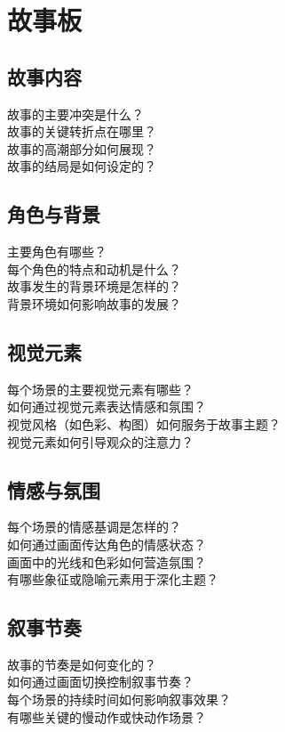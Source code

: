 \documentclass[12pt]{book}
\begin{document}
\section{故事板}
\subsection{故事内容}
故事的主要冲突是什么？\\
故事的关键转折点在哪里？\\
故事的高潮部分如何展现？\\
故事的结局是如何设定的？\\

\subsection{角色与背景}
主要角色有哪些？\\
每个角色的特点和动机是什么？\\
故事发生的背景环境是怎样的？\\
背景环境如何影响故事的发展？\\

\subsection{视觉元素}
每个场景的主要视觉元素有哪些？\\
如何通过视觉元素表达情感和氛围？\\
视觉风格（如色彩、构图）如何服务于故事主题？\\
视觉元素如何引导观众的注意力？\\

\subsection{情感与氛围}
每个场景的情感基调是怎样的？\\
如何通过画面传达角色的情感状态？\\
画面中的光线和色彩如何营造氛围？\\
有哪些象征或隐喻元素用于深化主题？\\

\subsection{叙事节奏}
故事的节奏是如何变化的？\\
如何通过画面切换控制叙事节奏？\\
每个场景的持续时间如何影响叙事效果？\\
有哪些关键的慢动作或快动作场景？\\
\end{document}
